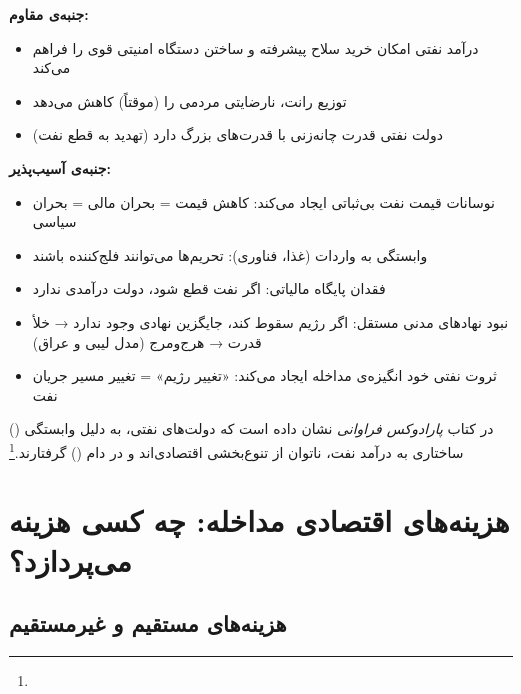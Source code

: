 \begin{tcolorbox}[wavebox, title={دولت رانتیر: هم مقاوم، هم آسیب‌پذیر}]
\textbf{جنبه‌ی مقاوم:}
\begin{itemize}
\item درآمد نفتی امکان خرید سلاح پیشرفته و ساختن دستگاه امنیتی قوی را فراهم می‌کند
\item توزیع رانت، نارضایتی مردمی را (موقتاً) کاهش می‌دهد
\item دولت نفتی قدرت چانه‌زنی با قدرت‌های بزرگ دارد (تهدید به قطع نفت)
\end{itemize}

\textbf{جنبه‌ی آسیب‌پذیر:}
\begin{itemize}
\item نوسانات قیمت نفت بی‌ثباتی ایجاد می‌کند: کاهش قیمت = بحران مالی = بحران سیاسی
\item وابستگی به واردات (غذا، فناوری): تحریم‌ها می‌توانند فلج‌کننده باشند
\item فقدان پایگاه مالیاتی: اگر نفت قطع شود، دولت درآمدی ندارد
\item نبود نهادهای مدنی مستقل: اگر رژیم سقوط کند، جایگزین نهادی وجود ندارد → خلأ قدرت → هرج‌ومرج (مدل لیبی و عراق)
\item ثروت نفتی خود انگیزه‌ی مداخله ایجاد می‌کند: «تغییر رژیم» = تغییر مسیر جریان نفت
\end{itemize}
\end{tcolorbox}

 () در کتاب \textit{پارادوکس فراوانی} نشان داده است که دولت‌های نفتی، به دلیل وابستگی ساختاری به درآمد نفت، ناتوان از تنوع‌بخشی اقتصادی‌اند و در دام  () گرفتارند.\footnote{}


\section{هزینه‌های اقتصادی مداخله: چه کسی هزینه می‌پردازد؟}
\label{sec:ch12-costs}

\subsection{هزینه‌های مستقیم و غیرمستقیم}
\label{subsec:ch12-costs-direct}

